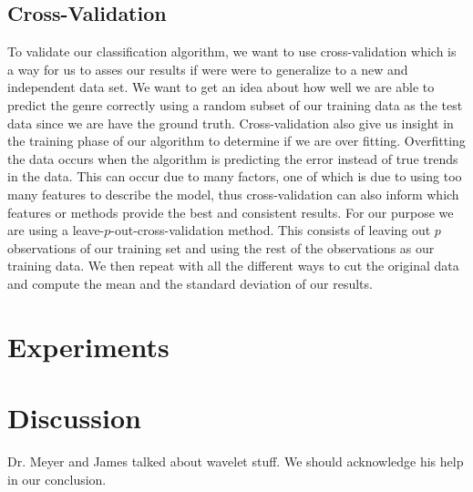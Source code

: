\documentclass[12pt]{article}
\begin{document}
\subsection{Cross-Validation}


To validate our classification algorithm, we want to use cross-validation which is a way for us to asses our results if were were to generalize to a new and independent data set. We want to get an idea about how well we are able to predict the genre correctly using a random subset of our training data as the test data since we are have the ground truth. Cross-validation also give us insight in the training phase of our algorithm to determine if we are over fitting. Overfitting the data occurs when the algorithm is predicting the error instead of true trends in the data. This can occur due to many factors, one of which is due to using too many features to describe the model, thus cross-validation can also inform which features or methods provide the best and consistent results. For our purpose we are using a leave-$p$-out-cross-validation method. This consists of leaving out $p$ observations of our training set and using the rest of the observations as our training data. We then repeat with all the different ways to cut the original data and compute the mean and the standard deviation of our results.

\section{Experiments}


\section{Discussion}


Dr. Meyer and James talked about wavelet stuff.  We should acknowledge his help in our conclusion.



\end{document}
